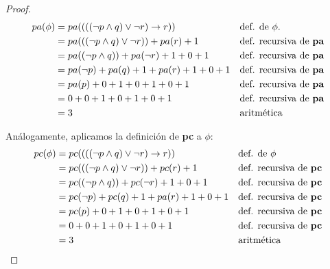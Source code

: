 \documentclass[letterpaper,10pt]{article}
\begin{document}
\begin{enumerate}
\begin{itemize}
\begin{proof}
                \begin{align*}
                    pa(\phi) 
                    &= pa(((( \neg p \land q) \lor \neg r) \rightarrow r))
                    && \text{def. de $\phi$.} \\
                    &= pa(((\neg p \land q) \lor \neg r)) + pa(r) + 1
                    && \text{def. recursiva de \textbf{pa}} \\
                    &= pa((\neg p \land q)) + pa(\neg r) + 1 + 0 + 1
                    && \text{def. recursiva de \textbf{pa}} \\
                    &= pa(\neg p) + pa(q) + 1 + pa(r) + 1 + 0 + 1
                    && \text{def. recursiva de \textbf{pa}} \\
                    &= pa(p) + 0 + 1 + 0 + 1 + 0 + 1
                    && \text{def. recursiva de \textbf{pa}} \\
                    &= 0 + 0 + 1 + 0 + 1 + 0 + 1
                    && \text{def. recursiva de \textbf{pa}} \\
                    &= 3
                    && \text{aritmética}
                \end{align*}

                Análogamente, aplicamos la definición de \textbf{pc} a $\phi$:
                \begin{align*}
                    pc(\phi) 
                    &= pc(((( \neg p \land q) \lor \neg r) \rightarrow r))
                    && \text{def. de $\phi$} \\
                    &= pc(((\neg p \land q) \lor \neg r)) + pc(r) + 1
                    && \text{def. recursiva de \textbf{pc}} \\
                    &= pc((\neg p \land q)) + pc(\neg r) + 1 + 0 + 1
                    && \text{def. recursiva de \textbf{pc}} \\
                    &= pc(\neg p) + pc(q) + 1 + pa(r) + 1 + 0 + 1
                    && \text{def. recursiva de \textbf{pc}} \\
                    &= pc(p) + 0 + 1 + 0 + 1 + 0 + 1
                    && \text{def. recursiva de \textbf{pc}} \\
                    &= 0 + 0 + 1 + 0 + 1 + 0 + 1
                    && \text{def. recursiva de \textbf{pc}} \\
                    &= 3
                    && \text{aritmética}
                \end{align*}


\end{proof}
\end{itemize}
\end{enumerate}
\end{document}

